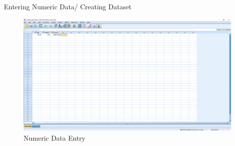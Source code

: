 \begin{frame}[t]{Entering Numeric Data/ Creating Dataset}
	\begin{figure}
		\centering
		\includegraphics[width= 12cm]{img/enter_data_1}
		\caption{Numeric Data Entry}
	\end{figure}
\end{frame}



